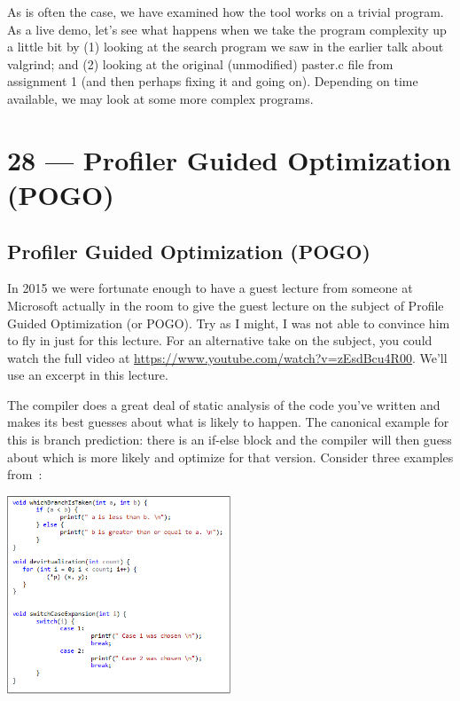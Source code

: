 \documentclass[a4paper]{report}
\begin{document}
As is often the case, we have examined how the tool works on a trivial program. As a live demo, let's see what happens when we take the program complexity up a little bit by (1) looking at the search program we saw in the earlier talk about valgrind; and (2) looking at the original (unmodified) paster.c file from assignment 1 (and then perhaps fixing it and going on). Depending on time available, we may look at some more complex programs.










\chapter*{28 --- Profiler Guided Optimization (POGO)}


\section*{Profiler Guided Optimization (POGO)}

In 2015 we were fortunate enough to have a guest lecture from someone at Microsoft actually in the room to give the guest lecture on the subject of Profile Guided Optimization (or POGO). Try as I might, I was not able to convince him to fly in just for this lecture. For an alternative take on the subject, you could watch the full video at \url{https://www.youtube.com/watch?v=zEsdBcu4R00}. We'll use an excerpt in this lecture.

The compiler does a great deal of static analysis of the code you've written and makes its best guesses about what is likely to happen. The canonical example for this is branch prediction: there is an if-else block and the compiler will then guess about which is more likely and optimize for that version. Consider three examples from~\cite{pogo}:

\begin{center}
	\includegraphics[width=0.5\textwidth]{images/4621codesnippet.png}
\end{center}
\end{document}
